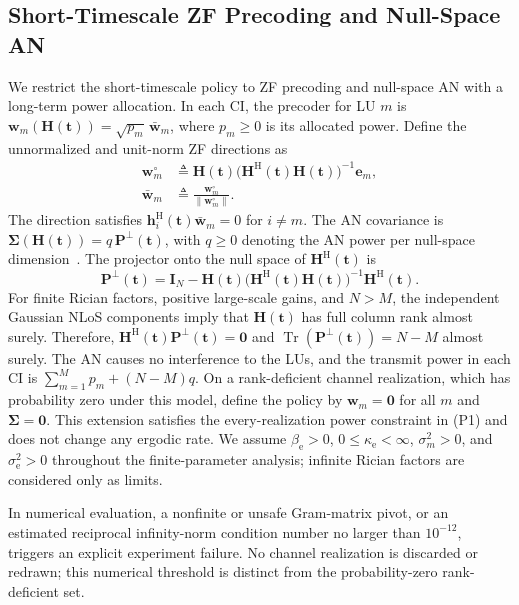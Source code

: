 \documentclass[journal]{IEEEtran}
\newcommand{\tr}{\operatorname{Tr}}
\newcommand{\bt}{\mathbf{t}}
\newcommand{\bh}{\mathbf{h}}
\newcommand{\bH}{\mathbf{H}}
\newcommand{\bI}{\mathbf{I}}
\newcommand{\bw}{\mathbf{w}}
\newcommand{\wb}{\bar{\mathbf{w}}}
\newcommand{\be}{\mathbf{e}}
\newcommand{\bSig}{\boldsymbol{\Sigma}}
\newcommand{\PHp}{\mathbf{P}^{\perp}(\bt)}
\begin{document}
\subsection{Short-Timescale ZF Precoding and Null-Space AN}\label{sec:zfan}

We restrict the short-timescale policy to ZF precoding and null-space AN with a long-term power allocation. In each CI, the precoder for LU $m$ is $\bw_m(\bH(\bt))=\sqrt{p_m}\,\wb_m$, where $p_m\ge0$ is its allocated power. Define the unnormalized and unit-norm ZF directions as
\begin{equation}\label{eq:zf}
\begin{aligned}
\bw_m^\circ&\triangleq\bH(\bt)
 \big(\bH^{\mathrm{H}}(\bt)\bH(\bt)\big)^{-1}\be_m,\\
\wb_m&\triangleq\frac{\bw_m^\circ}{\|\bw_m^\circ\|}.
\end{aligned}
\end{equation}
The direction satisfies $\bh_i^{\mathrm{H}}(\bt)\wb_m=0$ for $i\neq m$. The AN covariance is $\bSig(\bH(\bt))=q\,\PHp$, with $q\ge0$ denoting the AN power per null-space dimension~\cite{Zhou2010,ZhuTWC2014}. The projector onto the null space of $\bH^{\mathrm{H}}(\bt)$ is
\begin{equation}\label{eq:an}
\PHp=\bI_N-\bH(\bt)
 \big(\bH^{\mathrm{H}}(\bt)\bH(\bt)\big)^{-1}\bH^{\mathrm{H}}(\bt).
\end{equation}
For finite Rician factors, positive large-scale gains, and $N>M$, the independent Gaussian NLoS components imply that $\bH(\bt)$ has full column rank almost surely. Therefore, $\bH^{\mathrm{H}}(\bt)\PHp=\mathbf 0$ and $\tr(\PHp)=N-M$ almost surely. The AN causes no interference to the LUs, and the transmit power in each CI is $\sum_{m=1}^M p_m+(N-M)q$. On a rank-deficient channel realization, which has probability zero under this model, define the policy by $\bw_m=\mathbf 0$ for all $m$ and $\bSig=\mathbf 0$. This extension satisfies the every-realization power constraint in (P1) and does not change any ergodic rate. We assume $\beta_{\mathrm{e}}>0$, $0\le\kappa_{\mathrm{e}}<\infty$, $\sigma_m^2>0$, and $\sigma_{\mathrm{e}}^2>0$ throughout the finite-parameter analysis; infinite Rician factors are considered only as limits.

In numerical evaluation, a nonfinite or unsafe Gram-matrix pivot, or an estimated reciprocal infinity-norm condition number no larger than $10^{-12}$, triggers an explicit experiment failure. No channel realization is discarded or redrawn; this numerical threshold is distinct from the probability-zero rank-deficient set.
\end{document}
